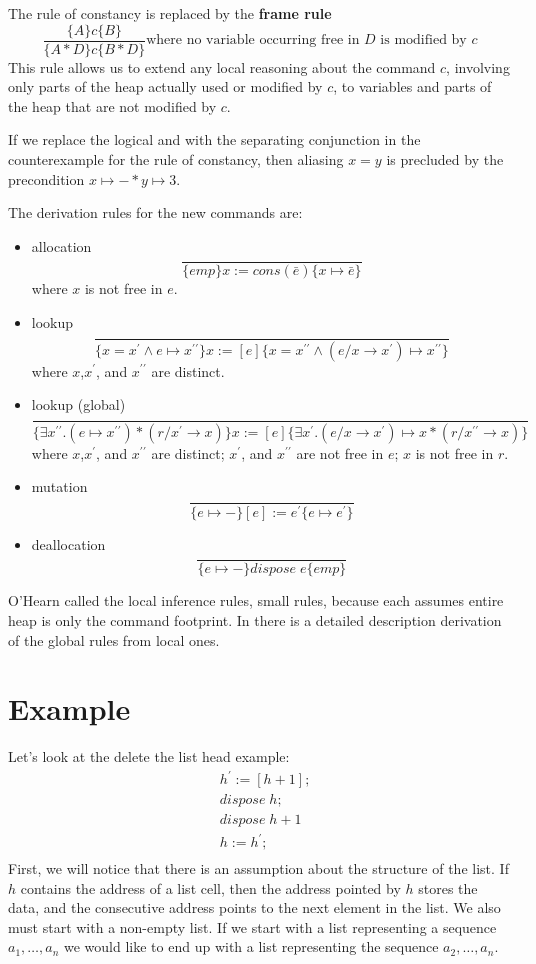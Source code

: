 \documentclass[12pt]{article}
\begin{document}
The rule of constancy is replaced by the \textbf{frame rule}
\[
\frac{\{A\}c\{B\}}{\{A * D \}c\{B * D\}} \mbox{where no variable occurring free in }D\mbox{ is modified by }c
\]
This rule allows us to extend any local reasoning about the command $c$, involving only parts of the heap actually used or modified by $c$, to variables and parts of the heap that are not modified by $c$.

If we replace the logical and with the separating conjunction in the counterexample for the rule of constancy, then aliasing $x=y$ is precluded by the precondition $x\mapsto - * y \mapsto 3$. 

The derivation rules for the new commands are:
\begin{itemize}
\item allocation
\[
\frac{}{\{emp\} x := cons(\bar{e}) \{ x \mapsto \bar{e}\}}
\] where $x$ is not free in $e$.
\item lookup
\[
\frac{}{\{x=x^\prime \wedge e \mapsto x^{\prime\prime} \} x := [e] \{ x=x^{\prime\prime} \wedge (e/x\to x^\prime) \mapsto x^{\prime\prime} \} }
\] where $x$,$x^\prime$, and $x^{\prime\prime}$ are distinct.
\item lookup (global)
\[
\frac{ }{ \{ \exists x^{\prime\prime}.(e \mapsto x^{\prime\prime}) * (r/x^\prime \to x)\}
x:=[e]
\{ \exists x^\prime. (e/x\to x^\prime) \mapsto x *(r/x^{\prime\prime} \to x) \}
 }
\] where $x$,$x^\prime$, and $x^{\prime\prime}$ are distinct; $x^\prime$, and $x^{\prime\prime}$ are not free in $e$; $x$ is not free in $r$.
\item mutation
\[
\frac{}{\{e\mapsto-\} [e] := e^\prime \{ e \mapsto e^\prime \}}
\]
\item deallocation
\[
\frac{}{ \{ e \mapsto - \} dispose \; e \{emp\} }
\]
\end{itemize}
O'Hearn called the local inference rules, small rules, because each assumes entire heap is only the command footprint. In \cite{ohearnintro} there is a detailed description derivation of the global rules from local ones. 

\section{Example} \label{sec:example}

Let's look at the delete the list head example:
\begin{align*}
&h^\prime:=[h+1];\\
&dispose \; h;\\
&dispose \; h+1\\
&h:=h^\prime;\\
\end{align*}
First, we will notice that there is an assumption about the structure of the list. If $h$ contains the address of a list cell, then the address pointed by $h$ stores the data, and the consecutive address points to the next element in the list. We also must start with a non-empty list. If we start with a list representing a sequence $a_1, \dots, a_n$ we would like to end up with a list representing the sequence $a_2,\dots,a_n$. 
 
\end{document}
